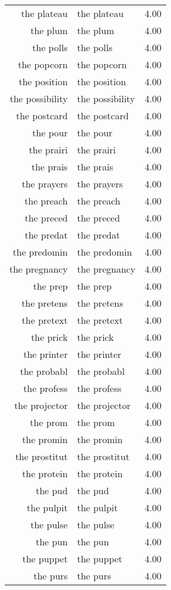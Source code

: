 \begin{table}[ht]
\begin{tabular}{rlr}
  the plateau & the plateau & 4.00 \\ 
  the plum & the plum & 4.00 \\ 
  the polls & the polls & 4.00 \\ 
  the popcorn & the popcorn & 4.00 \\ 
  the position & the position & 4.00 \\ 
  the possibility & the possibility & 4.00 \\ 
  the postcard & the postcard & 4.00 \\ 
  the pour & the pour & 4.00 \\ 
  the prairi & the prairi & 4.00 \\ 
  the prais & the prais & 4.00 \\ 
  the prayers & the prayers & 4.00 \\ 
  the preach & the preach & 4.00 \\ 
  the preced & the preced & 4.00 \\ 
  the predat & the predat & 4.00 \\ 
  the predomin & the predomin & 4.00 \\ 
  the pregnancy & the pregnancy & 4.00 \\ 
  the prep & the prep & 4.00 \\ 
  the pretens & the pretens & 4.00 \\ 
  the pretext & the pretext & 4.00 \\ 
  the prick & the prick & 4.00 \\ 
  the printer & the printer & 4.00 \\ 
  the probabl & the probabl & 4.00 \\ 
  the profess & the profess & 4.00 \\ 
  the projector & the projector & 4.00 \\ 
  the prom & the prom & 4.00 \\ 
  the promin & the promin & 4.00 \\ 
  the prostitut & the prostitut & 4.00 \\ 
  the protein & the protein & 4.00 \\ 
  the pud & the pud & 4.00 \\ 
  the pulpit & the pulpit & 4.00 \\ 
  the pulse & the pulse & 4.00 \\ 
  the pun & the pun & 4.00 \\ 
  the puppet & the puppet & 4.00 \\ 
  the purs & the purs & 4.00 \\ 

\end{tabular}
\end{table}
